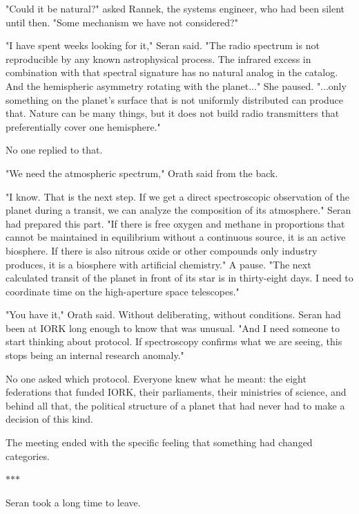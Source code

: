\documentclass[11pt,a5paper,twoside]{book}
\begin{document}
"Could it be natural?" asked Rannek, the systems engineer, who had been silent until then. "Some mechanism we have not considered?"

"I have spent weeks looking for it," Seran said. "The radio spectrum is not reproducible by any known astrophysical process. The infrared excess in combination with that spectral signature has no natural analog in the catalog. And the hemispheric asymmetry rotating with the planet..." She paused. "...only something on the planet's surface that is not uniformly distributed can produce that. Nature can be many things, but it does not build radio transmitters that preferentially cover one hemisphere."

No one replied to that.

"We need the atmospheric spectrum," Orath said from the back.

"I know. That is the next step. If we get a direct spectroscopic observation of the planet during a transit, we can analyze the composition of its atmosphere." Seran had prepared this part. "If there is free oxygen and methane in proportions that cannot be maintained in equilibrium without a continuous source, it is an active biosphere. If there is also nitrous oxide or other compounds only industry produces, it is a biosphere with artificial chemistry." A pause. "The next calculated transit of the planet in front of its star is in thirty-eight days. I need to coordinate time on the high-aperture space telescopes."

"You have it," Orath said. Without deliberating, without conditions. Seran had been at IORK long enough to know that was unusual. "And I need someone to start thinking about protocol. If spectroscopy confirms what we are seeing, this stops being an internal research anomaly."

No one asked which protocol. Everyone knew what he meant: the eight federations that funded IORK, their parliaments, their ministries of science, and behind all that, the political structure of a planet that had never had to make a decision of this kind.

The meeting ended with the specific feeling that something had changed categories.

\vspace{1.5em}
\begin{center}$\ast$\quad$\ast$\quad$\ast$\end{center}
\vspace{1.5em}

Seran took a long time to leave.
\end{document}
